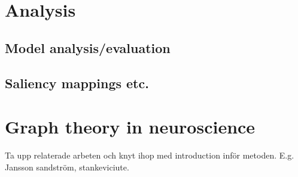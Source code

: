 \section{Analysis}
\subsection{Model analysis/evaluation}
\subsection{Saliency mappings etc.}

\section{Graph theory in neuroscience}
Ta upp relaterade arbeten och knyt ihop med introduction inför metoden. E.g. Jansson sandström, stankeviciute.

